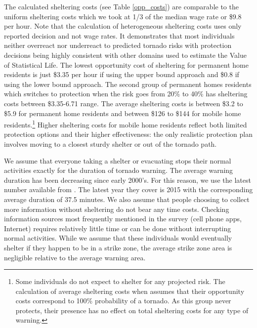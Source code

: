 \documentclass{ametsocV6.1}
\begin{document}


The calculated sheltering costs (see Table \ref{opp_costs}) are comparable to the uniform sheltering costs which we took at 1/3 of the median wage rate or \$9.8 per hour. Note that the calculation of heterogeneous sheltering costs uses only reported decision and not wage rates. It demonstrates that most individuals neither overreact nor underreact to predicted tornado risks with protection decisions being highly consistent with other domains used to estimate the Value of Statistical Life. The lowest opportunity cost of sheltering for permanent home residents is just \$3.35 per hour if using the upper bound approach and \$0.8 if using the lower bound approach. The second group of permanent homes residents which switches to protection when the risk goes from 20\% to 40\% has sheltering costs between \$3.35-6.71 range. The average sheltering costs is between \$3.2 to \$5.9 for permanent home residents and between \$126 to \$144 for mobile home residents.\footnote{Some individuals do not expect to shelter for any projected risk. The calculation of average sheltering costs when assumes that their opportunity costs correspond to 100\% probability of a tornado. As this group never protects, their presence has no effect on total sheltering costs for any type of warning.} Higher sheltering costs for mobile home residents reflect both limited protection options and their higher effectiveness: the only realistic protection plan involves moving to a closest sturdy shelter or out of the tornado path. 

We assume that everyone taking a shelter or evacuating stops their normal activities exactly for the duration of tornado warning. The average warning duration has been decreasing since early 2000’s. For this reason, we use the latest number available from \citet{brooks_long-term_2018}. The latest year they cover is 2015 with the corresponding average duration of 37.5 minutes. We also assume that people choosing to collect more information without sheltering do not bear any time costs. Checking information sources most frequently mentioned in the survey (cell phone apps, Internet) requires relatively little time or can be done without interrupting normal activities. While we assume that these individuals would eventually shelter if they happen to be in a strike zone, the average strike zone area is negligible relative to the average warning area.



\vspace{20pt}
\end{document}
